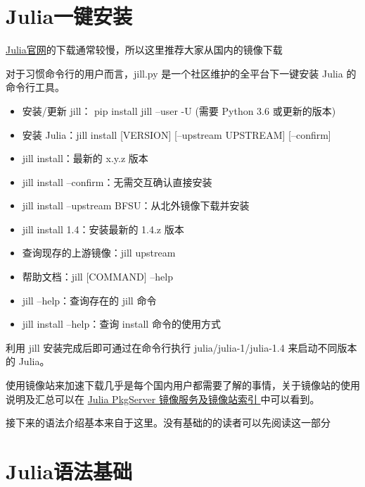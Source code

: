 \section{Julia一键安装}\label{sec1-2}

\href{https://julialang.org/downloads/}{Julia官网}的下载通常较慢，所以这里推荐大家从国内的镜像下载~

对于习惯命令行的用户而言，jill.py 是一个社区维护的全平台下一键安装 Julia 的命令行工具。

\begin{itemize}
    \item 安装/更新 jill： pip install jill --user -U (需要 Python 3.6 或更新的版本)

    \item 安装 Julia：jill install [VERSION] [--upstream UPSTREAM] [--confirm]

    \item jill install：最新的 x.y.z 版本

    \item jill install --confirm：无需交互确认直接安装

    \item jill install --upstream BFSU：从北外镜像下载并安装

    \item jill install 1.4：安装最新的 1.4.z 版本

    \item 查询现存的上游镜像：jill upstream

    \item 帮助文档：jill [COMMAND] --help

    \item jill --help：查询存在的 jill 命令

    \item jill install --help：查询 install 命令的使用方式
\end{itemize}

利用 jill 安装完成后即可通过在命令行执行 julia/julia-1/julia-1.4 来启动不同版本的 Julia。

使用镜像站来加速下载几乎是每个国内用户都需要了解的事情，关于镜像站的使用说明及汇总可以在 \href{https://discourse.juliacn.com/t/topic/2969}{Julia PkgServer 镜像服务及镜像站索引 }中可以看到。

接下来的语法介绍基本来自于这里\cite{Julia2023}。没有基础的的读者可以先阅读这一部分~

\section{Julia语法基础}\label{sec1-3}

